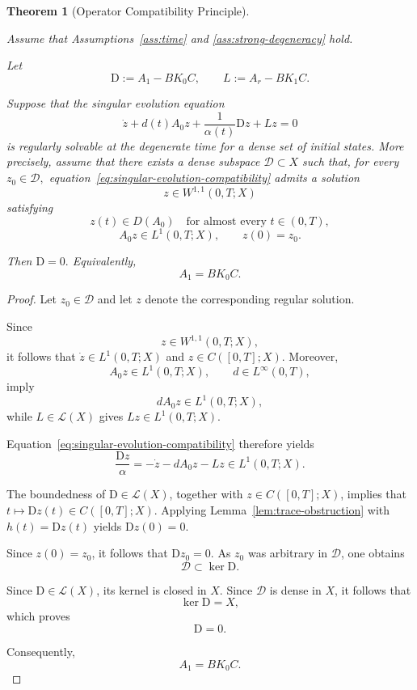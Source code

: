\documentclass[pdflatex,sn-mathphys-num]{sn-jnl}
\theoremstyle{thmstyleone}%
\newtheorem{theorem}{Theorem}%
\theoremstyle{thmstyletwo}%
\theoremstyle{thmstylethree}%
\begin{document}
\begin{theorem}[Operator Compatibility Principle]
\label{thm:compatibility-principle}

Assume that Assumptions~\ref{ass:time} and \ref{ass:strong-degeneracy} hold.

Let
\[
\mathrm D:=A_1-BK_0C,
\qquad
L:=A_r-BK_1C.
\]

Suppose that the singular evolution equation
\begin{equation}
\dot z
+
d(t)A_0z
+
\frac{1}{\alpha(t)}\mathrm{D}z
+
Lz
=
0
\label{eq:singular-evolution-compatibility}
\end{equation}
is regularly solvable at the degenerate time for a dense set of initial states. More precisely, assume that there exists a dense subspace
\(
\mathcal D\subset X
\)
such that, for every
\(
z_0\in\mathcal D,
\)
equation~\eqref{eq:singular-evolution-compatibility}
admits a solution
\[
z\in W^{1,1}(0,T;X)
\]
satisfying
\[
z(t)\in D(A_0)
\quad
\text{for almost every }
t\in(0,T),
\]
\[
A_0z\in L^1(0,T;X),
\qquad
z(0)=z_0.
\]

Then
\(
\mathrm D=0.
\)
Equivalently,
\[
A_1=BK_0C.
\]

\end{theorem}

\begin{proof}

Let \(z_0\in\mathcal D\) and let \(z\) denote the corresponding regular solution.

Since
\[
z\in W^{1,1}(0,T;X),
\]
it follows that
\(
\dot z\in L^1(0,T;X)
\)
and
\(
z\in C([0,T];X).
\)
Moreover,
\[
A_0z\in L^1(0,T;X),
\qquad
d\in L^\infty(0,T),
\]
imply
\[
dA_0z\in L^1(0,T;X),
\]
while \(L\in\mathcal L(X)\) gives
\(Lz\in L^1(0,T;X)\).

Equation~\eqref{eq:singular-evolution-compatibility} therefore yields
\[
\frac{\mathrm{D}z}{\alpha}
=
-\dot z
-
dA_0z
-
Lz
\in
L^1(0,T;X).
\]

The boundedness of \(\mathrm D\in\mathcal L(X)\), together with
\(z\in C([0,T];X)\), implies that \(t\mapsto \mathrm{D}z(t)\in C([0,T];X)\).
Applying Lemma~\ref{lem:trace-obstruction} with \(h(t)=\mathrm{D}z(t)\) yields \(\mathrm{D}z(0)=0\).

Since \(z(0)=z_0\), it follows that
\(\mathrm{D}z_0=0\).
As \(z_0\) was arbitrary in \(\mathcal D\), one obtains
\[
\mathcal D\subset\ker \mathrm D.
\]

Since \(\mathrm D\in\mathcal L(X)\), its kernel is closed in \(X\).
Since \(\mathcal D\) is dense in \(X\), it follows that
\[
\ker \mathrm D=X,
\]
which proves
\[
\mathrm D=0.
\]

Consequently,
\[
A_1=BK_0C.
\]

\end{proof}
\end{document}
